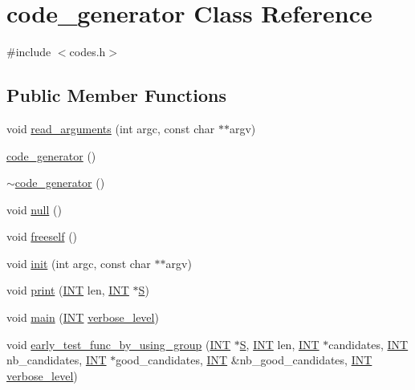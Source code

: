 \hypertarget{classcode__generator}{}\section{code\+\_\+generator Class Reference}
\label{classcode__generator}


{\ttfamily \#include $<$codes.\+h$>$}

\subsection*{Public Member Functions}
\begin{DoxyCompactItemize}
\item 
void \mbox{\hyperlink{classcode__generator_a261aada2343f945b9efe5e5233d72833}{read\+\_\+arguments}} (int argc, const char $\ast$$\ast$argv)
\item 
\mbox{\hyperlink{classcode__generator_a1218452973234e90972be154fc25bf92}{code\+\_\+generator}} ()
\item 
\mbox{\hyperlink{classcode__generator_a5a6ebae74ab6d7180e7ebb280336e7f7}{$\sim$code\+\_\+generator}} ()
\item 
void \mbox{\hyperlink{classcode__generator_a181c47b8f842145208524a53d746b21e}{null}} ()
\item 
void \mbox{\hyperlink{classcode__generator_a5493e5a36f07edb6e59a411d1a0770a7}{freeself}} ()
\item 
void \mbox{\hyperlink{classcode__generator_acfaa1e8badf6f30255203f499b130af8}{init}} (int argc, const char $\ast$$\ast$argv)
\item 
void \mbox{\hyperlink{classcode__generator_aa865507e914621b77e4aa4461a37945f}{print}} (\mbox{\hyperlink{galois_8h_a09fddde158a3a20bd2dcadb609de11dc}{I\+NT}} len, \mbox{\hyperlink{galois_8h_a09fddde158a3a20bd2dcadb609de11dc}{I\+NT}} $\ast$\mbox{\hyperlink{simeon_8_c_adab47f8243f1b5a2c31df2535d6b37d0}{S}})
\item 
void \mbox{\hyperlink{classcode__generator_ab3cf3a306e4032c2b471ac95321c599f}{main}} (\mbox{\hyperlink{galois_8h_a09fddde158a3a20bd2dcadb609de11dc}{I\+NT}} \mbox{\hyperlink{classcode__generator_a603e29bac4d2fb4de7237ac66405c9c1}{verbose\+\_\+level}})
\item 
void \mbox{\hyperlink{classcode__generator_a96a6170f5b9a905203ae4d8717750854}{early\+\_\+test\+\_\+func\+\_\+by\+\_\+using\+\_\+group}} (\mbox{\hyperlink{galois_8h_a09fddde158a3a20bd2dcadb609de11dc}{I\+NT}} $\ast$\mbox{\hyperlink{simeon_8_c_adab47f8243f1b5a2c31df2535d6b37d0}{S}}, \mbox{\hyperlink{galois_8h_a09fddde158a3a20bd2dcadb609de11dc}{I\+NT}} len, \mbox{\hyperlink{galois_8h_a09fddde158a3a20bd2dcadb609de11dc}{I\+NT}} $\ast$candidates, \mbox{\hyperlink{galois_8h_a09fddde158a3a20bd2dcadb609de11dc}{I\+NT}} nb\+\_\+candidates, \mbox{\hyperlink{galois_8h_a09fddde158a3a20bd2dcadb609de11dc}{I\+NT}} $\ast$good\+\_\+candidates, \mbox{\hyperlink{galois_8h_a09fddde158a3a20bd2dcadb609de11dc}{I\+NT}} \&nb\+\_\+good\+\_\+candidates, \mbox{\hyperlink{galois_8h_a09fddde158a3a20bd2dcadb609de11dc}{I\+NT}} \mbox{\hyperlink{classcode__generator_a603e29bac4d2fb4de7237ac66405c9c1}{verbose\+\_\+level}})

\end{DoxyCompactItemize}
